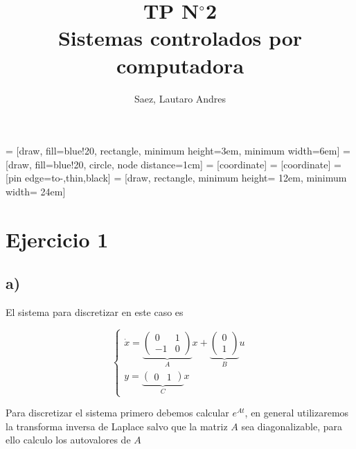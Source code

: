 \documentclass{article}
\title{TP N$^\circ$2 \\ Sistemas controlados por computadora}
\author{Saez, Lautaro Andres}
\date{}
\begin{document}
    \maketitle
  

     = [draw, fill=blue!20, rectangle, 
    minimum height=3em, minimum width=6em]
     = [draw, fill=blue!20, circle, node distance=1cm]
     = [coordinate]
     = [coordinate]
     = [pin edge={to-,thin,black}]
     = [draw, rectangle, minimum height= 12em, minimum width= 24em]

    \section{Ejercicio 1}

    \subsection{a)}

    El sistema para discretizar en este caso es 

    \begin{equation}
        \left\{
            \begin{array}{c}
                \dot{x} = \underbrace{
                        \begin{pmatrix}
                            0 & 1 \\
                            -1 & 0 
                        \end{pmatrix}
                        }_{A} x +
                        \underbrace{
                            \begin{pmatrix}
                                0 \\ 1
                            \end{pmatrix}
                        }_{B} u \\ 
                y = \underbrace{
                    \begin{pmatrix}
                        0 & 1
                    \end{pmatrix}
                }_{C} x
            \end{array}
        \right.
    \end{equation}

    Para discretizar el sistema primero debemos calcular $e^{At}$, en general utilizaremos la transforma inversa de Laplace salvo que la matriz $A$ sea 
    diagonalizable, para ello calculo los autovalores de $A$
\end{document}
